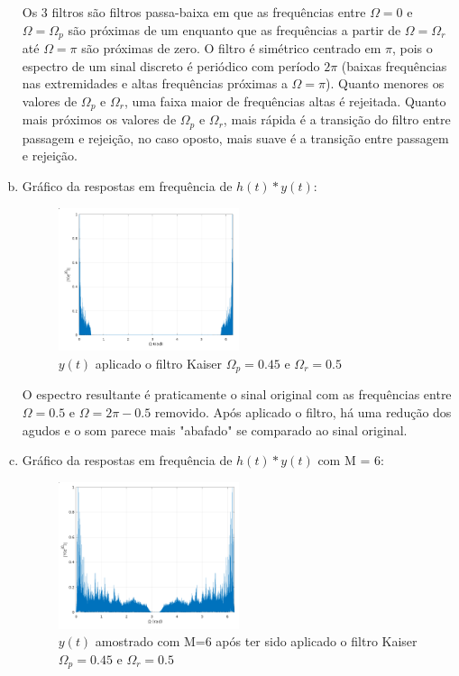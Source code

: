 \documentclass{article}
\begin{document}
\begin{enumerate}[(a)]
        Os 3 filtros são filtros passa-baixa em que as frequências entre $\Omega = 0$ e $\Omega = \Omega_p$ são próximas de um enquanto que as frequências a partir de $\Omega = \Omega_r$ até $\Omega = \pi$ são próximas de zero. O filtro é simétrico centrado em $\pi$, pois o espectro de um sinal discreto é periódico com período $2\pi$ (baixas frequências nas extremidades e altas frequências próximas a $\Omega = \pi$). Quanto menores os valores de $\Omega_p$ e $\Omega_r$, uma faixa maior de frequências altas é rejeitada. Quanto mais próximos os valores de $\Omega_p$ e $\Omega_r$, mais rápida é a transição do filtro entre passagem e rejeição, no caso oposto, mais suave é a transição entre passagem e rejeição.

\break\vfill

\item
    Gráfico da respostas em frequência de $h(t)*y(t)$:

    \begin{figure}[H]
    \centering
    \includegraphics[width=0.5\textwidth]{images/conv_h.png}
        \caption{$y(t)$ aplicado o filtro Kaiser $\Omega_p = 0.45$ e $\Omega_r = 0.5$}
    \end{figure}

    O espectro resultante é praticamente o sinal original com as frequências entre $\Omega = 0.5 \text{ e } \Omega = 2\pi - 0.5$ removido.
    Após aplicado o filtro, há uma redução dos agudos e o som parece mais "abafado" se comparado ao sinal original.

\item
    Gráfico da respostas em frequência de $h(t)*y(t)$ com M = 6:

    \begin{figure}[H]
    \centering
    \includegraphics[width=0.5\textwidth]{images/resamp_after_filter.png}
        \caption{$y(t)$ amostrado com M=6 após ter sido aplicado o filtro Kaiser $\Omega_p = 0.45$ e $\Omega_r = 0.5$}
    \end{figure}


\end{enumerate}
\end{document}
